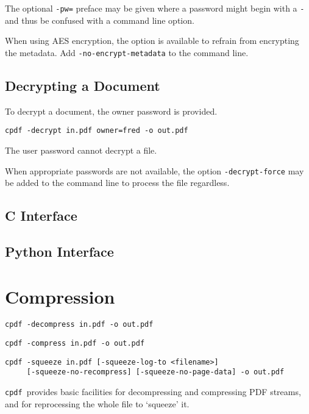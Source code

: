 \documentclass{book}
\newcommand{\cpdf}{\texttt{cpdf}}
\begin{document}
The optional \texttt{-pw=} preface may be given where a password might begin with a \texttt{-} and thus be confused with a command line option.

When using AES encryption, the option is available to refrain from encrypting the
metadata. Add \texttt{-no-encrypt-metadata} to the command line.

  \section{Decrypting a Document}
  To decrypt a document, the owner password is provided.
  \begin{framed}
    \small\verb!cpdf -decrypt in.pdf owner=fred -o out.pdf!
  \end{framed}
  \noindent The user password cannot decrypt a file.

When appropriate passwords are not available, the option \texttt{-decrypt-force} may be added to the command line to process the file regardless.


\begin{cpdflib}
\clearpage
\section*{C Interface}
\begin{small}\tt

\end{small}
\end{cpdflib}

\begin{pycpdflib}
\clearpage
\section*{Python Interface}
\begin{small}\tt

\end{small}
\end{pycpdflib}

\chapter{Compression}\label{chap:5}
  \begin{framed}
     \small\noindent\verb!cpdf -decompress in.pdf -o out.pdf!

     \vspace{1.5mm}
     \noindent\verb!cpdf -compress in.pdf -o out.pdf!
     
     \vspace{1.5mm}
     \noindent\verb!cpdf -squeeze in.pdf [-squeeze-log-to <filename>]!\\
     \noindent\verb!     [-squeeze-no-recompress] [-squeeze-no-page-data] -o out.pdf!   
   \end{framed}
  \cpdf\ provides basic facilities for decompressing and compressing PDF streams, and for reprocessing the whole file to `squeeze' it.
\end{document}
